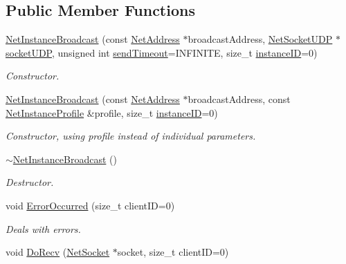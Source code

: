\subsection*{Public Member Functions}
\begin{DoxyCompactItemize}
\item 
\hyperlink{class_net_instance_broadcast_ab9892403571fa6a4e548fcc5033d33b2}{NetInstanceBroadcast} (const \hyperlink{class_net_address}{NetAddress} $\ast$broadcastAddress, \hyperlink{class_net_socket_u_d_p}{NetSocketUDP} $\ast$\hyperlink{class_net_instance_u_d_p_af86e8343ddf2daf0ce3f9ea701bc7cf3}{socketUDP}, unsigned int \hyperlink{class_net_instance_a39ed2f4325ce50a7c374ab6253650608}{sendTimeout}=INFINITE, size\_\-t \hyperlink{class_net_instance_a46bab6fc672f987ee3c52daabffe34f7}{instanceID}=0)
\begin{DoxyCompactList}\small\item\em Constructor. \item\end{DoxyCompactList}\item 
\hyperlink{class_net_instance_broadcast_a82412a5ed8a554597fa1c6c54b34576a}{NetInstanceBroadcast} (const \hyperlink{class_net_address}{NetAddress} $\ast$broadcastAddress, const \hyperlink{class_net_instance_profile}{NetInstanceProfile} \&profile, size\_\-t \hyperlink{class_net_instance_a46bab6fc672f987ee3c52daabffe34f7}{instanceID}=0)
\begin{DoxyCompactList}\small\item\em Constructor, using profile instead of individual parameters. \item\end{DoxyCompactList}\item 
\hyperlink{class_net_instance_broadcast_ae4111edc690767c7eac76c6e17e67478}{$\sim$NetInstanceBroadcast} ()
\begin{DoxyCompactList}\small\item\em Destructor. \item\end{DoxyCompactList}\item 
void \hyperlink{class_net_instance_broadcast_a4dd405fd8ee38f91eb569516b8d3fc93}{ErrorOccurred} (size\_\-t clientID=0)
\begin{DoxyCompactList}\small\item\em Deals with errors. \item\end{DoxyCompactList}\item 
void \hyperlink{class_net_instance_broadcast_a0b97764b7516ddce77fb302002842902}{DoRecv} (\hyperlink{class_net_socket}{NetSocket} $\ast$socket, size\_\-t clientID=0)

\end{DoxyCompactItemize}
